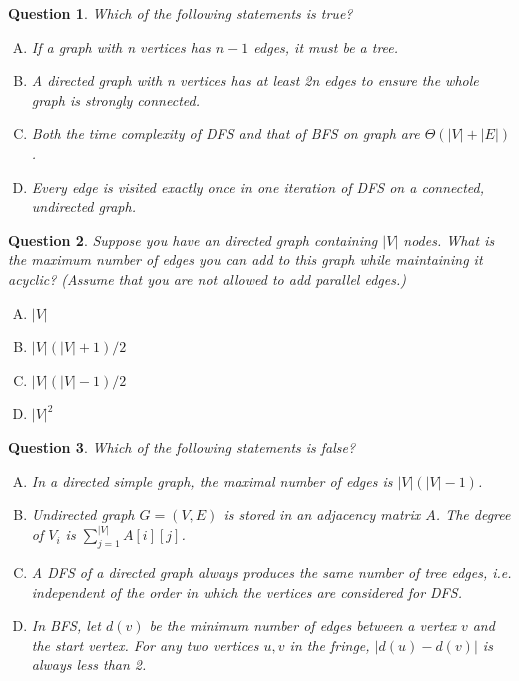 \documentclass[10.5pt]{article}
\newtheorem{Q}{Question}
\begin{document}
\begin{Q}Which of the following statements is true?
	\begin{enumerate}[(A)]
		\item If a graph with n vertices has $n-1$ edges, it must be a tree.
		\item A directed graph with n vertices has at least 2n edges to ensure the whole graph is strongly connected.
		\item Both the time complexity of DFS and that of BFS on graph are $\Theta(|V|+|E|)$ .
		\item Every edge is visited exactly once in one iteration of DFS on a connected, undirected graph.
	\end{enumerate}
\end{Q}

\begin{Q}
	Suppose you have an directed graph containing $|V|$ nodes. What is the maximum number of edges you can add to this graph while maintaining it acyclic? (Assume that you are not allowed to add parallel edges.)
	\begin{enumerate}[(A)]
		\item $|V|$
		\item $|V|(|V|+1)/2$
		\item $|V|(|V|-1)/2$
		\item $|V|^2$
	\end{enumerate}
\end{Q}

\begin{Q}Which of the following statements is false?
	\begin{enumerate}[(A)]
		\item In a directed simple graph, the maximal number of edges is $|V|(|V|-1)$.
		\item Undirected graph $G = (V, E)$ is stored in an adjacency matrix $A$. The degree of $V_i$ is $\sum_{j=1}^{|V|}A[i][j]$.
		\item A DFS of a directed graph always produces the same number of tree edges, i.e.
		      independent of the order in which the vertices are considered for DFS.
		\item In BFS, let $d(v)$ be the minimum number of edges between a vertex $v$ and the start vertex. For any two vertices $u, v$ in the fringe, $|d(u)-d(v)|$ is always less than 2.

	\end{enumerate}
\end{Q}
\end{document}
